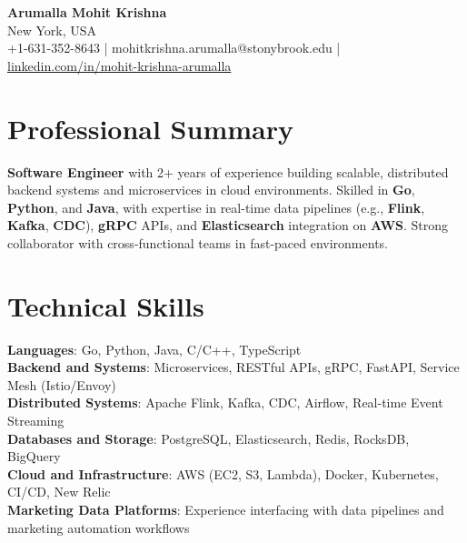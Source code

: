 \documentclass[letterpaper,11pt]{article}
\begin{document}
\begin{center}
  {\Large \textbf{Arumalla Mohit Krishna}} \\
  New York, USA \\
  +1-631-352-8643 \enspace | \enspace mohitkrishna.arumalla@stonybrook.edu \enspace | \enspace \href{https://www.linkedin.com/in/mohit-krishna-arumalla}{linkedin.com/in/mohit-krishna-arumalla}
\end{center}

\section{Professional Summary}
  \begin{itemize}[leftmargin=0.15in, label={}]
    \small{\item{
     \textbf{Software Engineer} with 2+ years of experience building scalable, distributed backend systems and microservices in cloud environments. Skilled in \textbf{Go}, \textbf{Python}, and \textbf{Java}, with expertise in real-time data pipelines (e.g., \textbf{Flink}, \textbf{Kafka}, \textbf{CDC}), \textbf{gRPC} APIs, and \textbf{Elasticsearch} integration on \textbf{AWS}. Strong collaborator with cross-functional teams in fast-paced environments.
    }}
  \end{itemize}
\vspace{-16pt}

\section{Technical Skills}
 \begin{itemize}[leftmargin=0.15in, label={}]
    \small{\item{
     \textbf{Languages}: Go, Python, Java, C/C++, TypeScript \\
     \textbf{Backend and Systems}: Microservices, RESTful APIs, gRPC, FastAPI, Service Mesh (Istio/Envoy) \\
     \textbf{Distributed Systems}: Apache Flink, Kafka, CDC, Airflow, Real-time Event Streaming \\
     \textbf{Databases and Storage}: PostgreSQL, Elasticsearch, Redis, RocksDB, BigQuery \\
     \textbf{Cloud and Infrastructure}: AWS (EC2, S3, Lambda), Docker, Kubernetes, CI/CD, New Relic \\
     \textbf{Marketing Data Platforms}: Experience interfacing with data pipelines and marketing automation workflows
    }}
 \end{itemize}
\vspace{-16pt}
\end{document}

